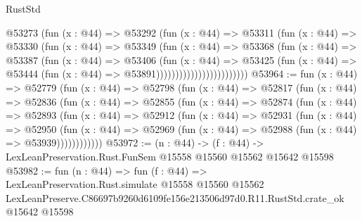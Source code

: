 \begin{lexlean}{RustStd}
\begin{coremodule}
                              @53273
                                (fun (x : @44) =>
                                @53292
                                  (fun (x : @44) =>
                                  @53311
                                    (fun (x : @44) =>
                                    @53330
                                      (fun (x : @44) =>
                                      @53349
                                        (fun (x : @44) =>
                                        @53368
                                          (fun (x : @44) =>
                                          @53387
                                            (fun (x : @44) =>
                                            @53406
                                              (fun (x : @44) =>
                                              @53425
                                                (fun (x : @44) =>
                                                @53444
                                                  (fun (x : @44) => @53891))))))))))))))))))))))))
@53964 := fun (x : @44) =>
  @52779
    (fun (x : @44) =>
    @52798
      (fun (x : @44) =>
      @52817
        (fun (x : @44) =>
        @52836
          (fun (x : @44) =>
          @52855
            (fun (x : @44) =>
            @52874
              (fun (x : @44) =>
              @52893
                (fun (x : @44) =>
                @52912
                  (fun (x : @44) =>
                  @52931
                    (fun (x : @44) =>
                    @52950
                      (fun (x : @44) =>
                      @52969 (fun (x : @44) => @52988 (fun (x : @44) => @53939))))))))))))
@53972 := (n : @44) ->
  (f : @44) -> LexLeanPreservation.Rust.FunSem @15558 @15560 @15562 @15642 @15598
@53982 := fun (n : @44) =>
  fun (f : @44) =>
  LexLeanPreservation.Rust.simulate
    @15558
    @15560
    @15562
    LexLeanPreserve.C86697b9260d6109fe156e213506d97d0.R11.RustStd.crate_ok
    @15642
    @15598
\end{coremodule}
\end{lexlean}

